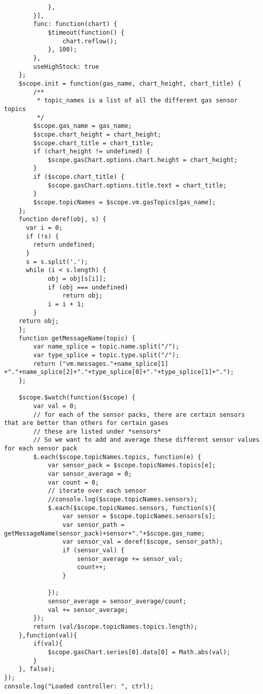 \begin{verbatim}
            },
        }],
        func: function(chart) {
            $timeout(function() {
                chart.reflow();
            }, 100);
        },    
        useHighStock: true
    };
    $scope.init = function(gas_name, chart_height, chart_title) {
        /**
         * topic_names is a list of all the different gas sensor topics
         */
        $scope.gas_name = gas_name;
        $scope.chart_height = chart_height;
        $scope.chart_title = chart_title;
        if (chart_height != undefined) {
            $scope.gasChart.options.chart.height = chart_height;
        }
        if ($scope.chart_title) {
            $scope.gasChart.options.title.text = chart_title;
        }
        $scope.topicNames = $scope.vm.gasTopics[gas_name];
    };
    function deref(obj, s) {
      var i = 0;
      if (!s) {
        return undefined;
      }
      s = s.split('.');
      while (i < s.length) {
            obj = obj[s[i]];
            if (obj === undefined)
                return obj;
            i = i + 1;
        }
    return obj;
    };
    function getMessageName(topic) {
        var name_splice = topic.name.split("/");
        var type_splice = topic.type.split("/");
        return ("vm.messages."+name_splice[1] +"."+name_splice[2]+"."+type_splice[0]+"."+type_splice[1]+".");
    };

    $scope.$watch(function($scope) {
        var val = 0;
        // for each of the sensor packs, there are certain sensors that are better than others for certain gases
        // these are listed under *sensors*
        // So we want to add and average these different sensor values for each sensor pack
        $.each($scope.topicNames.topics, function(e) {
            var sensor_pack = $scope.topicNames.topics[e];
            var sensor_average = 0;
            var count = 0;
            // iterate over each sensor
            //console.log($scope.topicNames.sensors);
            $.each($scope.topicNames.sensors, function(s){
                var sensor = $scope.topicNames.sensors[s];
                var sensor_path = getMessageName(sensor_pack)+sensor+"."+$scope.gas_name;
                var sensor_val = deref($scope, sensor_path);
                if (sensor_val) {
                    sensor_average += sensor_val;
                    count++;
                }

            });
            sensor_average = sensor_average/count;
            val += sensor_average;
        });
        return (val/$scope.topicNames.topics.length);
    },function(val){
        if(val){
            $scope.gasChart.series[0].data[0] = Math.abs(val);
        }
    }, false);
});
console.log("Loaded controller: ", ctrl);
\end{verbatim}


